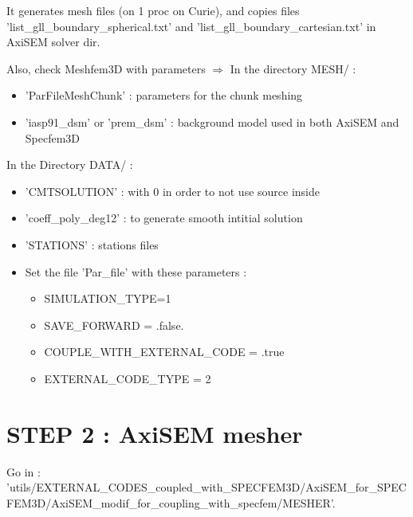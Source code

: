 \documentclass[11pt]{article}
\begin{document}
\noindent It generates mesh files (on 1 proc on Curie), and copies files 'list\_gll\_boundary\_spherical.txt' and 'list\_gll\_boundary\_cartesian.txt' in AxiSEM solver dir.

\bigskip
\medskip

\noindent Also, check Meshfem3D with parameters $\Longrightarrow$ In the directory MESH/ :

\begin{itemize}

\item[\textbullet] 'ParFileMeshChunk'  : parameters for the chunk meshing

\item[\textbullet] 'iasp91\_dsm' or 'prem\_dsm' : background model used in both AxiSEM and Specfem3D

\end{itemize}

\bigskip

\noindent In the Directory DATA/ :

\begin{itemize}

\item[\textbullet] 'CMTSOLUTION'  : with 0 in order to not use source inside

\item[\textbullet] 'coeff\_poly\_deg12' : to generate smooth intitial solution

\item[\textbullet] 'STATIONS'  : stations files

\item[\textbullet] Set the file 'Par\_file' with these parameters :

\begin{itemize}
\item[\textbullet] SIMULATION\_TYPE=1
\item[\textbullet] SAVE\_FORWARD = .false.
\item[\textbullet] COUPLE\_WITH\_EXTERNAL\_CODE = .true
\item[\textbullet] EXTERNAL\_CODE\_TYPE    = 2
\end{itemize}

\end{itemize}


\section{STEP 2 : AxiSEM mesher}

\noindent Go in  : {\scriptsize  'utils/EXTERNAL\_CODES\_coupled\_with\_SPECFEM3D/AxiSEM\_for\_SPECFEM3D/AxiSEM\_modif\_for\_coupling\_with\_specfem/MESHER'}.
\end{document}
